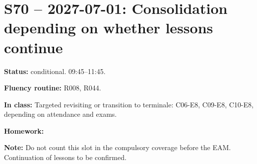 \section*{S70 -- 2027-07-01: Consolidation depending on whether lessons continue}
\textbf{Status:} conditional. 09:45–11:45.\par\textbf{Fluency routine:} R008, R044.\par\textbf{In class:} Targeted revisiting or transition to terminale: C06-E8, C09-E8, C10-E8, depending on attendance and exams.\par\textbf{Homework:} \par\textbf{Note:} Do not count this slot in the compulsory coverage before the EAM. Continuation of lessons to be confirmed.
